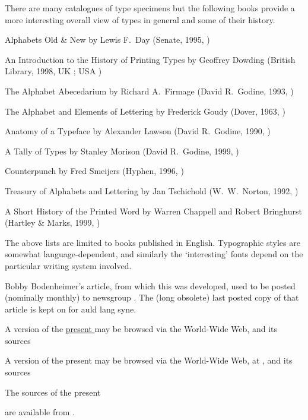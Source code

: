     There are many catalogues of type specimens but the following books provide
a more interesting overall view of types in general and some of their history.
\begin{booklist}
\item[Alphabets Old \& New]by Lewis F.~Day
  (Senate, 1995, )
\item[An Introduction to the History of Printing Types]by Geoffrey Dowding
  (British Library, 1998, UK ; USA )
\item[The Alphabet Abecedarium]by Richard A.~Firmage
  (David R.~Godine, 1993, )
\item[The Alphabet and Elements of Lettering]by Frederick Goudy
  (Dover, 1963, )
\item[Anatomy of a Typeface]by Alexander Lawson
  (David R.~Godine, 1990, )
\item[A Tally of Types]by Stanley Morison
  (David R.~Godine, 1999, )
\item[Counterpunch]by Fred Smeijers
  (Hyphen, 1996, )
\item[Treasury of Alphabets and Lettering]by Jan Tschichold
  (W.~W.~Norton, 1992, )
\item[A Short History of the Printed Word]by Warren Chappell and
  Robert Bringhurst (Hartley \& Marks, 1999, )
\end{booklist}

    The above lists are limited to books published in English. Typographic 
styles are somewhat language-dependent, and similarly the `interesting' fonts
depend on the particular writing system involved.


Bobby Bodenheimer's article, from which this  was developed, used
to be posted (nominally monthly) to newsgroup
. The (long
obsolete) last posted copy of that article is kept on  for
auld lang syne.

\begin{pdfversion}
A version of the \href{http://www.tex.ac.uk/faq}{present }
may be browsed via the World-Wide Web, and its sources
\end{pdfversion}
\begin{dviversion}
A version of the present  may be browsed via the World-Wide Web, at
 , and its sources
\end{dviversion}
\begin{htmlversion}
The sources of the present 
\end{htmlversion}
are available from .

